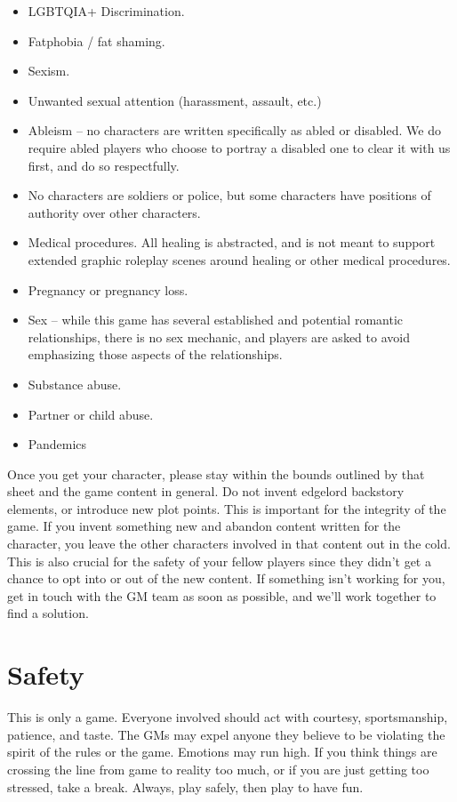 \documentclass[sheet]{GL2020}
\begin{document}
\begin{multicols}{2}
\begin{itemize}
  	\item LGBTQIA+ Discrimination.
	\item Fatphobia / fat shaming.
	\item Sexism.
\item Unwanted sexual attention (harassment, assault, etc.)
	\item Ableism -- no characters are written specifically as abled or disabled. We do require abled players who choose to portray a disabled one to clear it with us first, and do so respectfully.
	\item No characters are soldiers or police, but some characters have positions of authority over other characters.
	\item Medical procedures. All healing is abstracted, and is not meant to support extended graphic roleplay scenes around healing or other medical procedures.
	\item Pregnancy or pregnancy loss.
	\item Sex -- while this game has several established and potential romantic relationships, there is no sex mechanic, and players are asked to avoid emphasizing those aspects of the relationships.
	\item Substance abuse.
	\item Partner or child abuse.
	\item Pandemics
\end{itemize}
\end{multicols}

Once you get your character, please stay within the bounds outlined by that sheet and the game content in general. Do not invent edgelord backstory elements, or introduce new plot points. This is important for the integrity of the game. If you invent something new and abandon content written for the character, you leave the other characters involved in that content out in the cold. This is also crucial for the safety of your fellow players since they didn’t get a chance to opt into or out of the new content. If something isn’t working for you, get in touch with the GM team as soon as possible, and we’ll work together to find a solution.

\section{Safety}
This is only a game.  Everyone involved should act with courtesy, sportsmanship, patience, and taste.  The GMs may expel anyone they believe to be violating the spirit of the rules or the game.  Emotions may run high. If you think things are crossing the line from game to reality too much, or if you are just getting too stressed, take a break. Always, play safely, then play to have fun. 
\end{document}
